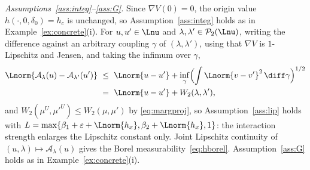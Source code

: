 \begin{example}
\smallskip
\emph{Assumptions~\ref{ass:integ}--\ref{ass:G}.} Since $\nabla V(0)=0$, the origin value
$h(\cdot,0,\delta_0)=h_c$ is unchanged, so Assumption~\ref{ass:integ} holds as in
Example~\ref{ex:concrete}(i). For $u,u'\in\Lnu$ and
$\lambda,\lambda'\in\mathcal P_2(\Lnu)$, writing the difference against an arbitrary
coupling $\gamma$ of $(\lambda,\lambda')$, using that $\nabla V$ is $1$-Lipschitz and
Jensen, and taking the infimum over $\gamma$,
\[
\begin{aligned}
\Lnorm{\mathcal A_\lambda(u)-\mathcal A_{\lambda'}(u')}
&\ \le\ \Lnorm{u-u'}+\inf_\gamma\Bigl(\int\Lnorm{v-v'}^2\,\diff\gamma\Bigr)^{1/2}\\
&\ =\ \Lnorm{u-u'}+W_2(\lambda,\lambda') ,
\end{aligned}
\]
and $W_2(\mu^U,\mu'^U)\le W_2(\mu,\mu')$ by \eqref{eq:margproj}, so
Assumption~\ref{ass:lip} holds with
$L=\max\{\beta_1+\varepsilon+\Lnorm{h_x},\beta_2+\Lnorm{h_x},1\}$: the
interaction strength enlarges the Lipschitz constant only. Joint Lipschitz continuity of
$(u,\lambda)\mapsto\mathcal A_\lambda(u)$ gives the Borel
measurability~\eqref{eq:hborel}. Assumption~\ref{ass:G} holds as in
Example~\ref{ex:concrete}(i).


\end{example}
